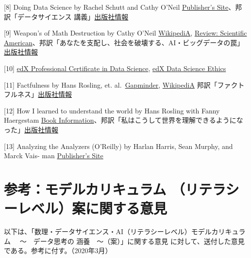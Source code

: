 \documentclass[
]{book}
\theoremstyle{definition}
\theoremstyle{definition}
\theoremstyle{definition}
\theoremstyle{definition}
\theoremstyle{remark}
\begin{document}
{[}8{]} Doing Data Science by Rachel Schutt and Cathy O'Neil \href{https://www.oreilly.com/library/view/doing-data-science/9781449363871/}{Publisher's Site}、邦訳「データサイエンス 講義」\href{https://www.oreilly.co.jp/books/9784873117010/}{出版社情報}

{[}9{]} Weapon's of Math Destruction by Cathy O'Neil \href{https://en.wikipedia.org/wiki/Weapons_of_Math_Destruction}{WikipediA}, \href{https://blogs.scientificamerican.com/roots-of-unity/review-weapons-of-math-destruction/}{Review: Scientific American}、邦訳「あなたを支配し、社会を破壊する、AI・ビッグデータの罠」\href{http://www.intershift.jp/w_aibg.html}{出版社情報}

{[}10{]} \href{https://online-learning.harvard.edu/series/professional-certificate-data-science}{edX Professional Certificate in Data Science}, \href{https://www.edx.org/course/data-science-ethics}{edX Data Science Ethics}

{[}11{]} Factfulness by Hans Rosling, et. al.~\href{https://www.gapminder.org/factfulness-book/}{Gapminder}, \href{https://en.wikipedia.org/wiki/Factfulness:_Ten_Reasons_We\%27re_Wrong_About_the_World_–_and_Why_Things_Are_Better_Than_You_Think}{WikipediA} 邦訳「ファクトフルネス」\href{https://bookplus.nikkei.com/atcl/catalog/19/P89600/}{出版社情報}

{[}12{]} How I learned to understand the world by Hans Rosling with Fanny Haergestam \href{https://us.macmillan.com/books/9781250266903/howilearnedtounderstandtheworld}{Book Information}、邦訳「私はこうして世界を理解できるようになった」\href{http://www.seidosha.co.jp/book/index.php?id=3351}{出版社情報}

{[}13{]} Analyzing the Analyzers (O'Reilly) by Harlan Harris, Sean Murphy, and Marck Vais- man \href{https://www.oreilly.com/library/view/analyzing-the-analyzers/9781449368388/}{Publisher's Site}

\hypertarget{ux53c2ux8003ux30e2ux30c7ux30ebux30abux30eaux30adux30e5ux30e9ux30e0-ux30eaux30c6ux30e9ux30b7ux30fcux30ecux30d9ux30ebux6848ux306bux95a2ux3059ux308bux610fux898b}{%
\section{参考：モデルカリキュラム （リテラシーレベル）案に関する意見}\label{ux53c2ux8003ux30e2ux30c7ux30ebux30abux30eaux30adux30e5ux30e9ux30e0-ux30eaux30c6ux30e9ux30b7ux30fcux30ecux30d9ux30ebux6848ux306bux95a2ux3059ux308bux610fux898b}}

以下は、「数理・データサイエンス・AI（リテラシーレベル）モデルカリキュラム 　～　データ思考の 涵養　～（案）」に関する意見 に対して、送付した意見である。参考に付す。（2020年3月）
\end{document}
